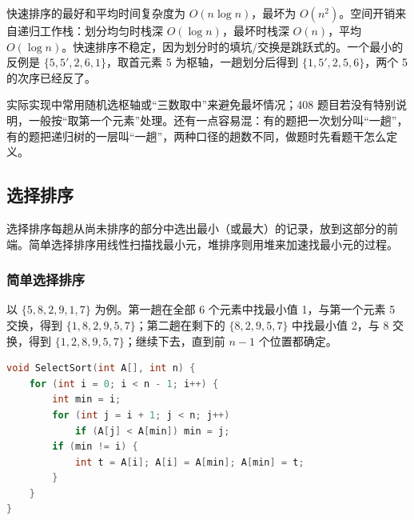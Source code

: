 快速排序的最好和平均时间复杂度为 $O(n\log n)$，最坏为 $O(n^2)$。空间开销来自递归工作栈：划分均匀时栈深 $O(\log n)$，最坏时栈深 $O(n)$，平均 $O(\log n)$。快速排序不稳定，因为划分时的填坑/交换是跳跃式的。一个最小的反例是 $\{5,5',2,6,1\}$，取首元素 5 为枢轴，一趟划分后得到 $\{1,5',2,5,6\}$，两个 5 的次序已经反了。

实际实现中常用随机选枢轴或“三数取中”来避免最坏情况；408 题目若没有特别说明，一般按“取第一个元素”处理。还有一点容易混：有的题把一次划分叫“一趟”，有的题把递归树的一层叫“一趟”，两种口径的趟数不同，做题时先看题干怎么定义。

\subsection{选择排序}

选择排序每趟从尚未排序的部分中选出最小（或最大）的记录，放到这部分的前端。简单选择排序用线性扫描找最小元，堆排序则用堆来加速找最小元的过程。

\subsubsection{简单选择排序}

以 $\{5,8,2,9,1,7\}$ 为例。第一趟在全部 6 个元素中找最小值 1，与第一个元素 5 交换，得到 $\{1,8,2,9,5,7\}$；第二趟在剩下的 $\{8,2,9,5,7\}$ 中找最小值 2，与 8 交换，得到 $\{1,2,8,9,5,7\}$；继续下去，直到前 $n-1$ 个位置都确定。

\begin{lstlisting}[language=C]
void SelectSort(int A[], int n) {
    for (int i = 0; i < n - 1; i++) {
        int min = i;
        for (int j = i + 1; j < n; j++)
            if (A[j] < A[min]) min = j;
        if (min != i) {
            int t = A[i]; A[i] = A[min]; A[min] = t;
        }
    }
}
\end{lstlisting}


